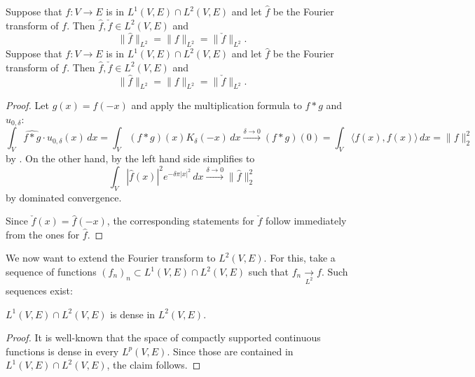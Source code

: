 \begin{theorem}
  \label{thm:plancherel}
  \leanok
   Suppose that $f : V \to E$ is in $L^1(V,E)\cap L^2(V,E)$ and let $\widehat{f}$ be the Fourier transform of $f$. Then $\widehat{f},\check{f}\in L^2(V,E)$ and
  \[\|\widehat{f}\|_{L^2} = \|f\|_{L^2}=\|\check f\|_{L^2}.\]
   Suppose that $f : V \to E$ is in $L^1(V,E)\cap L^2(V,E)$ and let $\widehat{f}$ be the Fourier transform of $f$. Then $\widehat{f},\check{f}\in L^2(V,E)$ and
  \[\|\widehat{f}\|_{L^2} = \|f\|_{L^2}=\|\check f\|_{L^2}.\]
  \end{theorem}
    \begin{proof}
    Let $g(x)=f(-x)$ and apply the multiplication formula 
    to $f\ast g$ and $u_{0,\delta}$: $$\int_V\widehat{f\ast g}\cdot u_{0,\delta}(x)\,dx=\int_V(f\ast g)(x)K_\delta(-x)\,dx
    \overset{\delta\to0}\to(f\ast g)(0)=\int_V \langle f(x),f(x)\rangle\,dx=\| f\|_2^2$$ by .
    On the other hand, by  the left hand side simplifies to
    $$\int_V|\widehat f(x)|^2e^{-\delta\pi|x|^2}\,dx\xrightarrow{\delta\to0}\|\widehat f\|_2^2$$ by dominated convergence.

    Since $\check f(x)=\widehat f(-x)$, the corresponding statements for $\check f$ follow immediately from the ones for $\widehat f$.
\end{proof}

We now want to extend the Fourier transform to $L^2(V,E)$. For this, take a sequence of functions $(f_n)_n\subset L^1(V,E)\cap L^2(V,E)$
such that $f_n\xrightarrow[L^2]{}f$. Such sequences exist:
\begin{lemma}
  \label{lem:L12-dense}
  \lean{}
  $L^1(V,E)\cap L^2(V,E)$ is dense in $L^2(V,E)$.
\end{lemma}
\begin{proof}
  It is well-known that the space of compactly supported continuous functions is dense in every $L^p(V,E)$.
  Since those are contained in $L^1(V,E)\cap L^2(V,E)$, the claim follows.
\end{proof}

